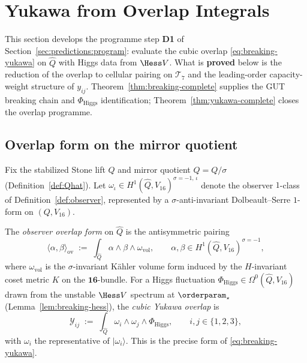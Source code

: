 \section{Yukawa from Overlap Integrals}
\label{sec:yukawa}

This section develops the programme step \textbf{D1} of
Section~\ref{sec:predictions:program}: evaluate the cubic overlap
\eqref{eq:breaking-yukawa} on $\hat Q$ with Higgs data from $\Hess V$.
What is \textbf{proved} below is the reduction of the overlap to cellular
pairing on $\mathcal{T}_7$ and the leading-order capacity-weight structure of
$y_{ij}$. Theorem~\ref{thm:breaking-complete} supplies the GUT breaking chain and
$\Phi_{\mathrm{Higgs}}$ identification; Theorem~\ref{thm:yukawa-complete}
closes the overlap programme.

\subsection{Overlap form on the mirror quotient}
\label{sec:yukawa:overlap}

Fix the stabilized Stone lift $Q$ and mirror quotient $\hat Q=Q/\sigma$
(Definition~\ref{def:Qhat}). Let $\omega_\iota\in
H^1(\hat Q,V_{16})^{\sigma=-1,\,\iota}$ denote the observer $1$-class of
Definition~\ref{def:observer}, represented by a $\sigma$-anti-invariant
Dolbeault--Serre $1$-form on $(Q,V_{16})$.

\begin{definition}\label{def:overlap-form}
The \emph{observer overlap form} on $\hat Q$ is the antisymmetric pairing
\begin{equation}\label{eq:overlap-form}
  \langle\alpha,\beta\rangle_{\mathrm{ov}}
  \;:=\;
  \int_{\hat Q}\alpha\wedge\beta\wedge\omega_{\mathrm{vol}},
  \qquad
  \alpha,\beta\in H^1(\hat Q,V_{16})^{\sigma=-1},
\end{equation}
where $\omega_{\mathrm{vol}}$ is the $\sigma$-invariant K\"ahler volume form
induced by the $H$-invariant coset metric $K$ on the $\mathbf{16}$-bundle.
For a Higgs fluctuation $\Phi_{\mathrm{Higgs}}\in\Omega^0(\hat Q,V_{16})$
drawn from the unstable $\Hess V$ spectrum at $\orderparam_\star$
(Lemma~\ref{lem:breaking-hess}), the \emph{cubic Yukawa overlap} is
\begin{equation}\label{eq:yukawa-overlap}
  \mathcal{Y}_{ij}
  \;:=\;
  \int_{\hat Q}\omega_i\wedge\omega_j\wedge\Phi_{\mathrm{Higgs}},
  \qquad i,j\in\{1,2,3\},
\end{equation}
with $\omega_i$ the representative of $|\omega_i\rangle$. This is the
precise form of \eqref{eq:breaking-yukawa}.
\end{definition}

